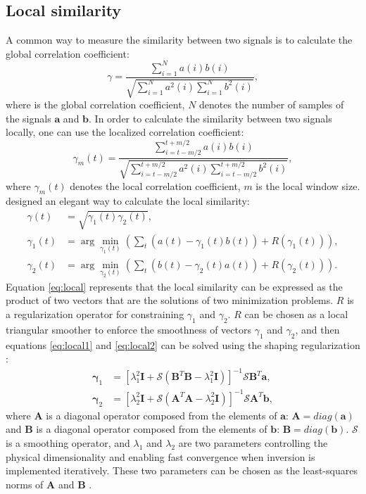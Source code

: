 \subsection{Local similarity}
A common way to measure the similarity between two signals is to calculate the global correlation coefficient:
\begin{equation}
\label{eq:simi}
\gamma=\frac{\displaystyle\sum_{i=1}^Na(i)b(i)}{\displaystyle\sqrt{\sum_{i=1}^Na^2(i)\sum_{i=1}^Nb^2(i)}},
\end{equation}
where \new{$\gamma$} is the global correlation coefficient, $N$ denotes the number of samples of the signals $\mathbf{a}$ and $\mathbf{b}$. In order to calculate the similarity between two signals locally, one can use the localized correlation coefficient:
\begin{equation}
\label{eq:simi}
\gamma_m(t)=\frac{\displaystyle\sum_{i=t-m/2}^{t+m/2} a(i) b(i)}{\sqrt{\displaystyle\sum_{i=t-m/2}^{t+m/2} a^2(i) \displaystyle\sum_{i=t-m/2}^{t+m/2} b^2(i) }},
\end{equation}
where $\gamma_m(t)$ denotes the local correlation coefficient, $m$ is the local window size. \\
\cite{fomel2007localattr} designed an elegant way to calculate the local similarity: 
\begin{align}
\label{eq:local}
\gamma(t) & =\sqrt{\gamma_1(t)\gamma_2(t)}, \\
\label{eq:local1}
\gamma_1(t)&=\arg\min_{\gamma_1(t)} \left(\sum_{t}(a(t)-\gamma_1(t)b(t)) + R(\gamma_1(t)) \right), \\
\label{eq:local2}
\gamma_2(t)&=\arg\min_{\gamma_2(t)} \left(\sum_{t}(b(t)-\gamma_2(t)a(t)) + R(\gamma_2(t)) \right).
\end{align}
Equation \ref{eq:local} represents that the local similarity can be expressed as the product of two vectors that are the solutions of two minimization problems. $R$ is a regularization operator for constraining $\gamma_1$ and $\gamma_2$. $R$ can be chosen as a local triangular smoother to enforce the smoothness of vectors $\gamma_1$ and $\gamma_2$, and then equations \ref{eq:local1} and \ref{eq:local2} can be solved using the shaping regularization \cite[]{fomel2007shape}:
\begin{align}
\label{eq:local3}
\mathbf{\gamma}_1 &= [\lambda_1^2\mathbf{I} + \mathcal{S}(\mathbf{B}^T\mathbf{B}-\lambda_1^2\mathbf{I})]^{-1}\mathcal{S}\mathbf{B}^T\mathbf{a},\\
\label{eq:local4}
\mathbf{\gamma}_2 &= [\lambda_2^2\mathbf{I} + \mathcal{S}(\mathbf{A}^T\mathbf{A}-\lambda_2^2\mathbf{I})]^{-1}\mathcal{S}\mathbf{A}^T\mathbf{b},
\end{align}
where $\mathbf{A}$ is a diagonal operator composed from the elements of $\mathbf{a}$: $\mathbf{A}=diag(\mathbf{a})$ and $\mathbf{B}$ is a diagonal operator composed from the elements of $\mathbf{b}$: $\mathbf{B}=diag(\mathbf{b})$. $\mathbf{\mathcal{S}}$ is a smoothing operator, and $\lambda_1$ and $\lambda_2$ are two parameters controlling the physical dimensionality and enabling fast convergence when inversion is implemented iteratively. These two parameters can be chosen as the least-squares norms of $\mathbf{A}$ and $\mathbf{B}$ \cite[]{fomel2007localattr}.

